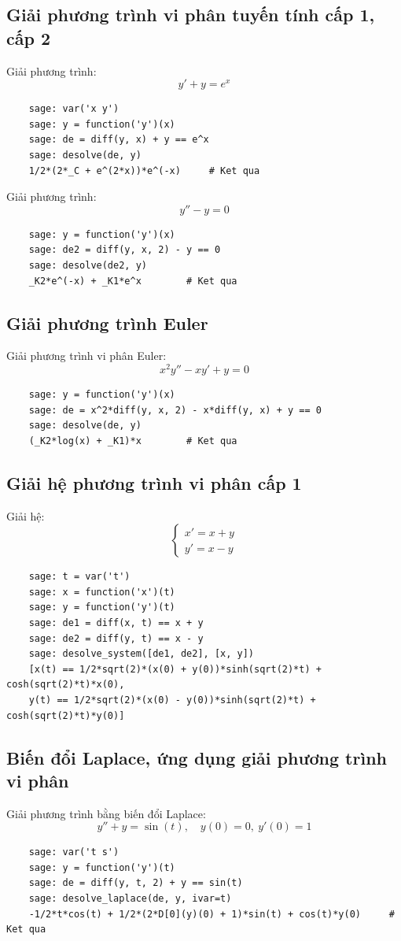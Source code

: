 \subsection{Giải phương trình vi phân tuyến tính cấp 1, cấp 2}
Giải phương trình:
\[
y' + y = e^x
\]
\begin{lstlisting}
	sage: var('x y')
	sage: y = function('y')(x)
	sage: de = diff(y, x) + y == e^x
	sage: desolve(de, y)
	1/2*(2*_C + e^(2*x))*e^(-x)		# Ket qua
\end{lstlisting}
Giải phương trình:
\[
y'' - y = 0
\]	
\begin{lstlisting}
	sage: y = function('y')(x)
	sage: de2 = diff(y, x, 2) - y == 0
	sage: desolve(de2, y)
	_K2*e^(-x) + _K1*e^x		# Ket qua
\end{lstlisting}

\subsection{Giải phương trình Euler}
Giải phương trình vi phân Euler:
\[
x^2 y'' - x y' + y = 0
\]
\begin{lstlisting}
	sage: y = function('y')(x)
	sage: de = x^2*diff(y, x, 2) - x*diff(y, x) + y == 0
	sage: desolve(de, y)
	(_K2*log(x) + _K1)*x		# Ket qua
\end{lstlisting}

\subsection{Giải hệ phương trình vi phân cấp 1}
Giải hệ:
\[
\begin{cases}
	x' = x + y \\
	y' = x - y
\end{cases}
\]
\begin{lstlisting}
	sage: t = var('t')
	sage: x = function('x')(t)
	sage: y = function('y')(t)
	sage: de1 = diff(x, t) == x + y
	sage: de2 = diff(y, t) == x - y
	sage: desolve_system([de1, de2], [x, y])
	[x(t) == 1/2*sqrt(2)*(x(0) + y(0))*sinh(sqrt(2)*t) + cosh(sqrt(2)*t)*x(0),
	y(t) == 1/2*sqrt(2)*(x(0) - y(0))*sinh(sqrt(2)*t) + cosh(sqrt(2)*t)*y(0)]
\end{lstlisting}

\subsection{Biến đổi Laplace, ứng dụng giải phương trình vi phân}
Giải phương trình bằng biến đổi Laplace:
\[
y'' + y = \sin(t), \quad y(0) = 0,\ y'(0) = 1
\] 
\begin{lstlisting}
	sage: var('t s')
	sage: y = function('y')(t)
	sage: de = diff(y, t, 2) + y == sin(t)
	sage: desolve_laplace(de, y, ivar=t)
	-1/2*t*cos(t) + 1/2*(2*D[0](y)(0) + 1)*sin(t) + cos(t)*y(0)		# Ket qua
\end{lstlisting}

